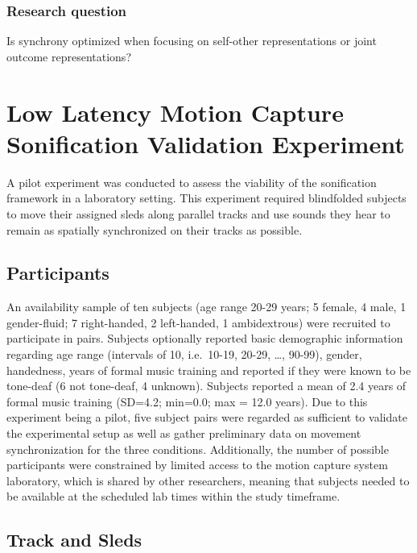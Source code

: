 \documentclass[10pt,a4paper,onecolumn]{article}
\begin{document}
\hypertarget{research-question}{%
\subsubsection{Research question}\label{research-question}}

Is synchrony optimized when focusing on self-other representations or joint outcome representations?

\hypertarget{low-latency-motion-capture-sonification-validation-experiment}{%
\section{Low Latency Motion Capture Sonification Validation Experiment}\label{low-latency-motion-capture-sonification-validation-experiment}}

A pilot experiment was conducted to assess the viability of the sonification framework in a laboratory setting. This experiment required blindfolded subjects to move their assigned sleds along parallel tracks and use sounds they hear to remain as spatially synchronized on their tracks as possible.

\hypertarget{participants}{%
\subsection{Participants}\label{participants}}

An availability sample of ten subjects (age range 20-29 years; 5 female, 4 male, 1 gender-fluid; 7 right-handed, 2 left-handed, 1 ambidextrous) were recruited to participate in pairs. Subjects optionally reported basic demographic information regarding age range (intervals of 10, i.e.~10-19, 20-29, \ldots, 90-99), gender, handedness, years of formal music training and reported if they were known to be tone-deaf (6 not tone-deaf, 4 unknown). Subjects reported a mean of 2.4 years of formal music training (SD=4.2; min=0.0; max = 12.0 years). Due to this experiment being a pilot, five subject pairs were regarded as sufficient to validate the experimental setup as well as gather preliminary data on movement synchronization for the three conditions. Additionally, the number of possible participants were constrained by limited access to the motion capture system laboratory, which is shared by other researchers, meaning that subjects needed to be available at the scheduled lab times within the study timeframe.

\hypertarget{track-and-sleds}{%
\subsection{Track and Sleds}\label{track-and-sleds}}
\end{document}

